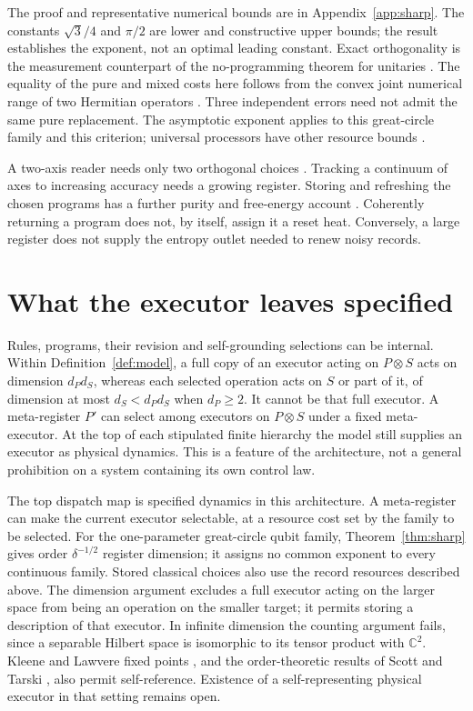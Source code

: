 \documentclass[12pt,a4paper]{article}
\begin{document}
The proof and representative numerical bounds are in Appendix~\ref{app:sharp}. The constants $\sqrt3/4$ and $\pi/2$ are lower and constructive upper bounds; the result establishes the exponent, not an optimal leading constant. Exact orthogonality is the measurement counterpart of the no-programming theorem for unitaries \cite{NielsenChuang1997}. The equality of the pure and mixed costs here follows from the convex joint numerical range of two Hermitian operators \cite{GutkinJonckheereKarow2004}. Three independent errors need not admit the same pure replacement. The asymptotic exponent applies to this great-circle family and this criterion; universal processors have other resource bounds \cite{Kubicki2019}.

A two-axis reader needs only two orthogonal choices \cite{WorldImprint}. Tracking a continuum of axes to increasing accuracy needs a growing register. Storing and refreshing the chosen programs has a further purity and free-energy account \cite{Liu2026PaperE,Liu2026PaperF}. Coherently returning a program does not, by itself, assign it a reset heat. Conversely, a large register does not supply the entropy outlet needed to renew noisy records.

\section{What the executor leaves specified}
\label{sec:cut}

Rules, programs, their revision and self-grounding selections can be internal.
Within Definition~\ref{def:model}, a full copy of an executor acting on
$P\otimes S$ acts on dimension $d_Pd_S$, whereas each selected operation acts
on $S$ or part of it, of dimension at most $d_S<d_Pd_S$ when $d_P\ge2$.
It cannot be that full executor. A meta-register $P'$ can select among executors
on $P\otimes S$ under a fixed meta-executor. At the top of each stipulated finite
hierarchy the model still supplies an executor as physical dynamics. This is a
feature of the architecture, not a general prohibition on a system containing
its own control law.

The top dispatch map is specified dynamics in this architecture.
A meta-register can make the current executor selectable, at a resource cost set
by the family to be selected. For the one-parameter great-circle qubit family,
Theorem~\ref{thm:sharp} gives order $\delta^{-1/2}$ register dimension; it assigns
no common exponent to every continuous family. Stored classical choices also use
the record resources described above. The dimension argument excludes a full
executor acting on the larger space from being an operation on the smaller target;
it permits storing a description of that executor. In infinite dimension the counting
argument fails, since a separable Hilbert space is isomorphic to its tensor product
with $\mathbb C^2$. Kleene and Lawvere fixed points \cite{Kleene1952,Lawvere1969},
and the order-theoretic results of Scott and Tarski \cite{Scott1972,Tarski1955},
also permit self-reference. Existence of a self-representing physical executor in
that setting remains open.
\end{document}
